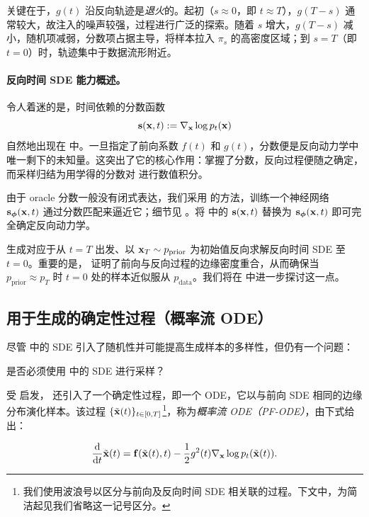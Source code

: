 关键在于，$g(t)$ 沿反向轨迹是\emph{退火}的。起初（$s\approx 0$，即 $t\approx T$），$g(T-s)$ 通常较大，故注入的噪声较强，过程进行广泛的探索。随着 $s$ 增大，$g(T-s)$ 减小，随机项减弱，分数项占据主导，将样本拉入 $\pi_s$ 的高密度区域；到 $s=T$（即 $t=0$）时，轨迹集中于数据流形附近。




\paragraph{反向时间 SDE 能力概述。}

令人着迷的是，时间依赖的分数函数
\[
{\mathbf{s}}({\mathbf{x}}, t) := \nabla_{{\mathbf{x}}} \log p_t({\mathbf{x}})
\]
自然地出现在  中。一旦指定了前向系数 $f(t)$ 和 $g(t)$，分数便是反向动力学中唯一剩下的未知量。这突出了它的核心作用：掌握了分数，反向过程便随之确定，而采样归结为用学得的分数对  进行数值积分。

由于 oracle 分数一般没有闭式表达，我们采用  的方法，训练一个神经网络 $\mathbf{s}_{\bm{\phi}}({\mathbf{x}}, t)$ 通过分数匹配来逼近它；细节见 。将  中的 ${\mathbf{s}}({\mathbf{x}}, t)$ 替换为 $\mathbf{s}_{\bm{\phi}}({\mathbf{x}}, t)$ 即可完全确定反向动力学。

生成对应于从 $t = T$ 出发、以 ${\mathbf{x}}_T \sim p_{\mathrm{prior}}$ 为初始值反向求解反向时间 SDE 至 $t = 0$。重要的是，\citet{anderson1982reverse} 证明了前向与反向过程的边缘密度重合，从而确保当 $p_{\mathrm{prior}} \approx p_T$ 时 $t=0$ 处的样本近似服从 $p_{\mathrm{data}}$。我们将在  中进一步探讨这一点。






\subsection{用于生成的确定性过程（概率流 ODE）}\label{subsec:pf-ode}
 尽管  中的 SDE 引入了随机性并可能提高生成样本的多样性，但仍有一个问题：
\begin{question}
    是否必须使用  中的 SDE 进行采样？
\end{question}

受 \citet{maoutsa2020interacting} 启发，\citet{song2020score} 还引入了一个确定性过程，即一个 ODE，它以与前向 SDE 相同的边缘分布演化样本。该过程 $\{\tilde{{\mathbf{x}}}(t)\}_{t\in[0,T]}$\footnote{我们使用波浪号以区分与前向及反向时间 SDE 相关联的过程。下文中，为简洁起见我们省略这一记号区分。}，称为\emph{概率流 ODE（PF-ODE）}，由下式给出：
\begin{mdframed}
    \begin{equation}\label{eq:prob_ode_gt}
    \frac{\mathop{}\!\mathrm{d}}{\mathop{}\!\mathrm{d} t}\tilde{{\mathbf{x}}}(t) = \mathbf{f}(\tilde{{\mathbf{x}}}(t), t) - \frac{1}{2} g^2(t) \nabla_{{\mathbf{x}}} \log p_t(\tilde{{\mathbf{x}}}(t)).
    \end{equation}
\end{mdframed}

